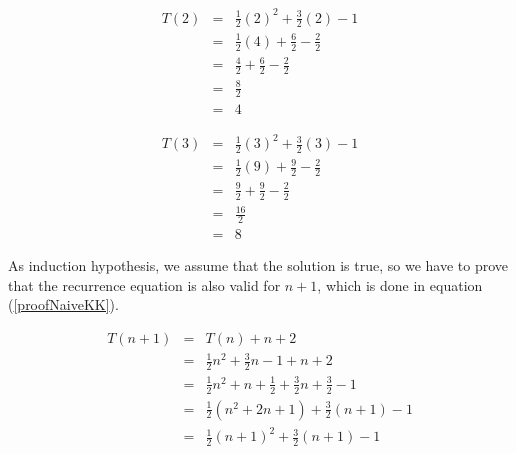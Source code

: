 \documentclass[tikz, 12pt]{scrartcl}
\begin{document}
\begin{equation}\label{verifyNaiveKKT2}
\begin{array}{ccc}
T(2)	&	=	&	\frac{1}{2}(2)^2 + \frac{3}{2}(2) - 1 \\	
		&	=	& 	\frac{1}{2}(4) + \frac{6}{2} - \frac{2}{2} \\
		&	=	& 	\frac{4}{2} + \frac{6}{2} - \frac{2}{2} \\
		&	=	&	\frac{8}{2} \\
		&	=	&	4
\end{array}
\end{equation}

\begin{equation}\label{verifyNaiveKKT3}
\begin{array}{ccc}
T(3)	&	=	&	\frac{1}{2}(3)^2 + \frac{3}{2}(3) - 1 \\	
		&	=	& 	\frac{1}{2}(9) + \frac{9}{2} - \frac{2}{2} \\
		&	=	& 	\frac{9}{2} + \frac{9}{2} - \frac{2}{2} \\
		&	=	&	\frac{16}{2} \\
		&	=	&	8
\end{array}
\end{equation}

As induction hypothesis, we assume that the solution is true, so we have to prove that the recurrence equation is also valid for $n + 1$, which is done in equation (\ref{proofNaiveKK}).

\begin{equation}\label{proofNaiveKK}
\begin{array}{ccl}
T(n + 1) 	&	= 	&	T(n) + n + 2 \\
			&	=	&	\frac{1}{2}n^2 + \frac{3}{2}n - 1 + n + 2\\
			&	=	&	\frac{1}{2}n^2 + n + \frac{1}{2} + \frac{3}{2}n + \frac{3}{2} - 1 \\
			&	=	&	\frac{1}{2}(n^2 + 2n + 1) + \frac{3}{2}(n + 1) - 1 \\
			&	=	&	\frac{1}{2}(n + 1)^2 + 	\frac{3}{2}(n + 1) - 1
\end{array}
\end{equation}
\end{document}
